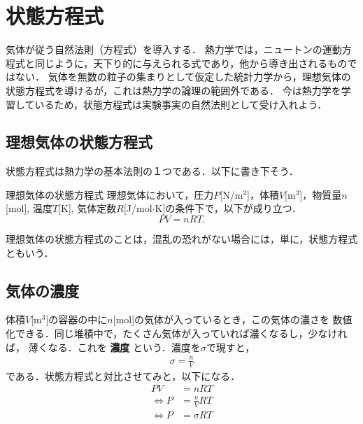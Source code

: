         \section{状態方程式}
        \begin{mycomment}
            気体が従う自然法則（方程式）を導入する．
            熱力学では，ニュートンの運動方程式と同じように，天下り的に与えられる式であり，他から導き出されるものではない．
            気体を無数の粒子の集まりとして仮定した統計力学から，理想気体の状態方程式を導けるが，これは熱力学の論理の範囲外である．
            今は熱力学を学習しているため，状態方程式は実験事実の自然法則として受け入れよう．
        \end{mycomment}
        \subsection{理想気体の状態方程式}
        状態方程式は熱力学の基本法則の１つである．以下に書き下そう．
        \begin{myshadebox}{理想気体の状態方程式}
            理想気体において，圧力$P$[N/m${}^{2}$]，体積$V$[m${}^{3}$]，物質量$n$[mol], 温度$T$[K],
            気体定数$R$[J/mol$\cdot$K]の条件下で，以下が成り立つ．
            \begin{equation}
                PV = nRT.
            \end{equation}
        \end{myshadebox}

        理想気体の状態方程式のことは，混乱の恐れがない場合には，単に，状態方程式ともいう．

        \subsection{気体の濃度}
        体積$V$[m${}^{3}$]の容器の中に$n$[mol]の気体が入っているとき，この気体の濃さを
        数値化できる．同じ堆積中で，たくさん気体が入っていれば濃くなるし，少なければ，
        薄くなる．これを \textbf{濃度} という．濃度を$\sigma$で現すと，
            \begin{align}
                \sigma = \frac{n}{V}
            \end{align}
        である．状態方程式と対比させてみと，以下になる．
            \begin{align*}
                 PV &= nRT \\
                \Leftrightarrow P &= \frac{n}{V}RT \\
                \Leftrightarrow P &= \sigma RT \\
            \end{align*}

